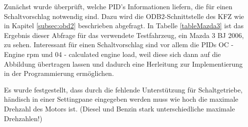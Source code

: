 Zunächst wurde überprüft, welche PID's Informationen liefern, die für einen Schaltvorschlag notwendig sind. Dazu wird die ODB2-Schnittstelle des KFZ wie in Kapitel \ref{subsec:obd2} beschrieben abgefragt. In Tabelle \ref{tableMazda3} ist das Ergebnis dieser Abfrage für das verwendete Testfahrzeug, ein Mazda 3 BJ 2006, zu sehen. Interessant für einen Schaltvorschlag sind vor allem die PIDs OC - Engine rpm und 04 - calculated engine load, weil diese sich dann auf die Abbildung übertragen lassen und dadurch eine Herleitung zur Implementierung in der Programmierung ermöglichen.

Es wurde festgestellt, dass durch die fehlende Unterstützung für Schaltgetriebe, händisch in einer Settingpane eingegeben werden muss wie hoch die maximale Drehzahl des Motors ist. (Diesel und Benzin stark unterschiedliche maximale Drehzahlen!)

